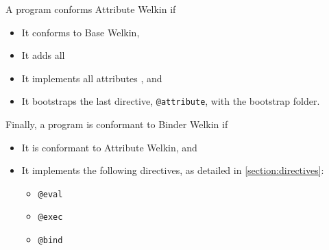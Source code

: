 A program conforms Attribute Welkin if
\begin{itemize}
  \item It conforms to Base Welkin,
  \item It adds all
  \item It implements all attributes , and
  \item It bootstraps the last directive, \texttt{@attribute}, with the bootstrap folder.
\end{itemize}


Finally, a program is conformant to Binder Welkin if
\begin{itemize}
  \item It is conformant to Attribute Welkin, and
  \item It implements the following directives, as detailed in \ref{section:directives}:
  \begin{itemize}
    \item \texttt{@eval}
    \item \texttt{@exec}
    \item \texttt{@bind}
  \end{itemize}



\end{itemize}
